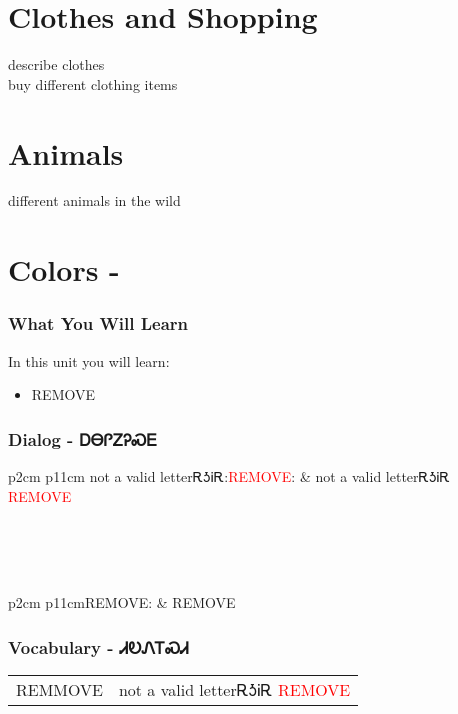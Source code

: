 \chapter{Clothes and Shopping}
describe clothes\\
buy different clothing items\\
\chapter{Animals}
different animals in the wild\\
\index{}
\chapter{Colors - }
\subsection{What You Will Learn}
In this unit you will learn:
\begin{itemize}
\item REMOVE
\end{itemize}\newpage

\newpage\subsection{Dialog - ᎠᎾᎵᏃᎮᏍᎬ}
\begin{tabular}{p{2cm} p{11cm}}
not a valid letterᎡᎼᎥᎡ:\newline \textcolor{red}{REMOVE}: & not a valid letterᎡᎼᎥᎡ 
\newline\textcolor{red}{REMOVE}\\
\end{tabular}
\\
\\
\\
\noindent\begin{tabular}{p{2cm} p{11cm}}REMOVE: & REMOVE\\
\end{tabular}
\vfill\newpage\subsection{Vocabulary - ᏗᎧᏁᎢᏍᏗ 
}
\begin{minipage}{\linewidth}
\begin{tabular}{p{3cm} p{11cm}}
REMMOVE & not a valid letterᎡᎼᎥᎡ 
 \newline \textcolor{red}{REMOVE}\\
\end{tabular}
\end{minipage}

